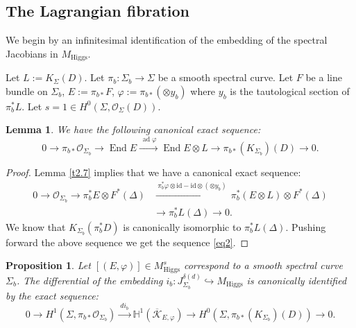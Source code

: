 \documentclass[12pt,a4paper,oneside,english]{smfart}
\newtheorem{prop}[thm]{Proposition}
\newtheorem{lem}[thm]{Lemma}
\theoremstyle{definition}
\theoremstyle{remark}
\DeclareMathOperator{\End}{End}
\DeclareMathOperator{\ad}{ad}
\newcommand{\Hig}{\mathrm{Higgs}}
\newcommand{\MH}{M_{\Hig}}
\newcommand{\MHs}{M^{s}_{\Hig}}
\newcommand{\cO}{\mathcal{O}}
\newcommand{\KK}{\mathscr{K}}
\newcommand{\HH}{\mathbb{H}}
\begin{document}
\subsection{The Lagrangian fibration}\label{sec:8.1}

We begin by an infinitesimal identification of the embedding of the spectral Jacobians in $\MH$.

Let $L := K_\Sigma(D)$. Let $\pi_b \colon \Sigma_b \to \Sigma$ be a smooth spectral curve. Let $F$ be a line bundle on $\Sigma_b$, $E := \pi_{b*}F$, $\varphi := \pi_{b*}(\otimes y_b)$ where $y_b$ is the tautological section of $\pi_b^* L$. Let $s = 1 \in H^0(\Sigma, \cO_\Sigma(D))$.

\begin{lem}\label{t8.1}
We have the following canonical exact sequence:
\begin{equation}\label{eq2}
0 \to \pi_{b*}\cO_{\Sigma_b} \to \End E \xrightarrow{\ \ad \varphi\ } \End E \otimes L \to \pi_{b*}(K_{\Sigma_b})(D) \to 0.
\end{equation}
\end{lem}

\begin{proof}
Lemma \ref{t2.7} implies that we have a canonical exact sequence:
\begin{align*}
0 \to \cO_{\Sigma_b} \to \pi_b^* E \otimes F^*(\Delta)
&\xrightarrow{\ \pi_b^*\varphi \otimes \mathrm{id} - \mathrm{id} \otimes (\otimes y_b)\ } \pi_b^*(E \otimes L) \otimes F^*(\Delta) \\
&\longrightarrow \pi_b^* L(\Delta) \to 0.
\end{align*}
We know that $K_{\Sigma_b}(\pi_b^* D)$ is canonically isomorphic to $\pi_b^* L(\Delta)$. Pushing forward the above sequence we get the sequence \eqref{eq2}.
\end{proof}

\begin{prop}\label{t8.2}
Let $[(E, \varphi)] \in \MHs$ correspond to a smooth spectral curve $\Sigma_b$. The differential of the embedding $i_b \colon J^{\delta(d)}_{\Sigma_b} \hookrightarrow \MH$ is canonically identified by the exact sequence:
\begin{equation}\label{eq3}
0 \to H^1(\Sigma, \pi_{b*}\cO_{\Sigma_b}) \xrightarrow{\ d i_b\ } \HH^1(\overline{\KK}_{E, \varphi}) \to H^0(\Sigma, \pi_{b*}(K_{\Sigma_b})(D)) \to 0.
\end{equation}
\end{prop}
\end{document}
